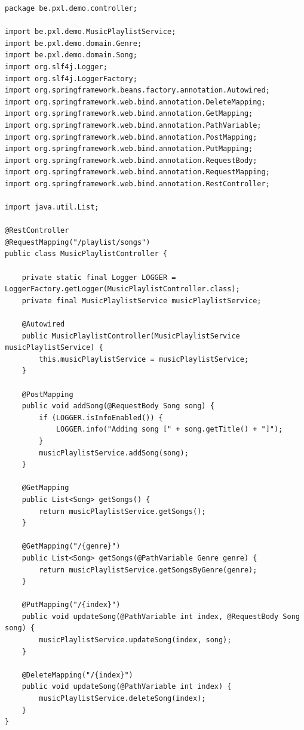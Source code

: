 \begin{lstlisting}
package be.pxl.demo.controller;

import be.pxl.demo.MusicPlaylistService;
import be.pxl.demo.domain.Genre;
import be.pxl.demo.domain.Song;
import org.slf4j.Logger;
import org.slf4j.LoggerFactory;
import org.springframework.beans.factory.annotation.Autowired;
import org.springframework.web.bind.annotation.DeleteMapping;
import org.springframework.web.bind.annotation.GetMapping;
import org.springframework.web.bind.annotation.PathVariable;
import org.springframework.web.bind.annotation.PostMapping;
import org.springframework.web.bind.annotation.PutMapping;
import org.springframework.web.bind.annotation.RequestBody;
import org.springframework.web.bind.annotation.RequestMapping;
import org.springframework.web.bind.annotation.RestController;

import java.util.List;

@RestController
@RequestMapping("/playlist/songs")
public class MusicPlaylistController {

	private static final Logger LOGGER = LoggerFactory.getLogger(MusicPlaylistController.class);
	private final MusicPlaylistService musicPlaylistService;

	@Autowired
	public MusicPlaylistController(MusicPlaylistService musicPlaylistService) {
		this.musicPlaylistService = musicPlaylistService;
	}

	@PostMapping
	public void addSong(@RequestBody Song song) {
		if (LOGGER.isInfoEnabled()) {
			LOGGER.info("Adding song [" + song.getTitle() + "]");
		}
		musicPlaylistService.addSong(song);
	}

	@GetMapping
	public List<Song> getSongs() {
		return musicPlaylistService.getSongs();
	}

	@GetMapping("/{genre}")
	public List<Song> getSongs(@PathVariable Genre genre) {
		return musicPlaylistService.getSongsByGenre(genre);
	}

	@PutMapping("/{index}")
	public void updateSong(@PathVariable int index, @RequestBody Song song) {
		musicPlaylistService.updateSong(index, song);
	}

	@DeleteMapping("/{index}")
	public void updateSong(@PathVariable int index) {
		musicPlaylistService.deleteSong(index);
	}
}
\end{lstlisting}


